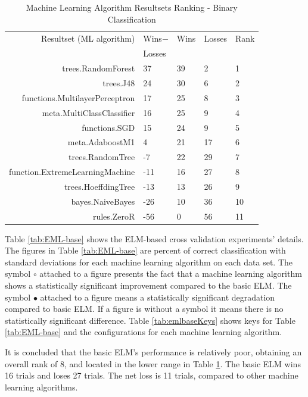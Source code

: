 \documentclass[a4paper, 14pt]{extarticle}
\begin{document}
\begin{table}[thb]
\caption{\label{tab:binaryRank}Machine Learning Algorithm Resultsets Ranking  - Binary Classification}
\footnotesize
{\centering \begin{tabular}{rllll}\\
\hline
Resultset (ML algorithm) & Wins$-$ & Wins & Losses& Rank  \\
& Losses & & & \\
\hline
trees.RandomForest &  37 &  39 &   2 &1\\
trees.J48 &  24 &  30 &   6 &2\\
 functions.MultilayerPerceptron&  17 &  25 &   8  &3\\
meta.MultiClassClassifier &  16 &  25 &   9 &4\\
 functions.SGD&  15 &  24 &   9 &5\\
meta.AdaboostM1 &   4 &  21 &  17 &6\\
trees.RandomTree &  -7 &  22 &  29 &7\\
function.ExtremeLearningMachine & -11 &  16 &  27 &8\\
trees.HoeffdingTree & -13 &  13 &  26 &9\\
 bayes.NaiveBayes& -26 &  10 &  36 &10\\
rules.ZeroR & -56 &   0 &  56  &11\\
\hline
\end{tabular} \footnotesize \par}
\end{table}
Table \ref{tab:EML-base} shows the ELM-based cross validation experiments' details. The figures in Table \ref{tab:EML-base} are percent of correct classification with standard deviations for each machine learning algorithm on each data set. The symbol $\circ$ attached to a figure presents the fact that a machine learning algorithm shows a statistically significant improvement compared to the basic ELM. The symbol $\bullet$ attached to a figure means a statistically significant degradation compared to basic ELM. If a figure is without a symbol it means there is no statistically significant difference. Table \ref{tab:emlbaseKeys} shows keys for Table \ref{tab:EML-base} and the configurations for each machine learning algorithm. 
\par It is concluded that the basic ELM's performance is relatively poor, obtaining an overall rank of 8, and located in the lower range in Table \ref{tab:binaryRank}. The basic ELM wins 16 trials and loses 27 trials. The net loss is 11 trials, compared to other machine learning algorithms.  
\end{document}

